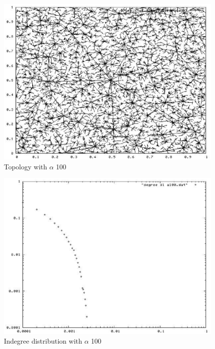 \documentclass[a4paper,12pt]{article}
\begin{document}
\begin{figure}
\begin{center}
\includegraphics[scale=0.6]{pic_alfa100.eps}
\end{center}
\caption{Topology with $\alpha$ 100\label{t100figure}}
\end{figure}

\begin{figure}
\begin{center}
\includegraphics[scale=0.6]{picdegree_alfa100.eps}
\end{center}
\caption{Indegree distribution with $\alpha$ 100\label{d100figure}}
\end{figure}
\end{document}
